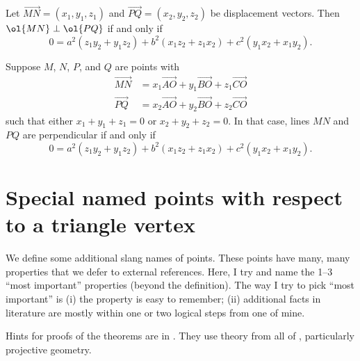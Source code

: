 \documentclass[11pt]{scrartcl}
\begin{document}
\begin{theorem}
  Let $\overrightarrow{MN} = (x_1, y_1, z_1)$
  and $\overrightarrow{PQ} = (x_2, y_2, z_2)$ be displacement vectors.
  Then $\ol{MN} \perp \ol{PQ}$ if and only if
  \[  0 = a^2(z_1y_2 + y_1z_2) + b^2(x_1z_2 + z_1x_2) + c^2(y_1x_2 + x_1y_2). \]
\end{theorem}

\begin{theorem}
  Suppose $M$, $N$, $P$, and $Q$ are points with
  \begin{align*}
    \overrightarrow{MN} &= x_1 \overrightarrow{AO} + y_1 \overrightarrow{BO} + z_1 \overrightarrow{CO} \\
    \overrightarrow{PQ} &= x_2 \overrightarrow{AO} + y_2 \overrightarrow{BO} + z_2 \overrightarrow{CO}
  \end{align*}
  such that either $x_1+y_1+z_1=0$ or $x_2+y_2+z_2=0$.
  In that case, lines $MN$ and $PQ$ are perpendicular if and only if
  \[ 0 = a^2(z_1y_2 + y_1z_2) + b^2(x_1z_2 + z_1x_2) + c^2(y_1x_2 + x_1y_2). \]
\end{theorem}

\newpage

\section{Special named points with respect to a triangle vertex}
\label{sec:named}

We define some additional slang names of points.
These points have many, many properties that we defer to external references.
Here, I try and name the 1--3 ``most important'' properties (beyond the definition).
The way I try to pick ``most important'' is (i) the property is easy to remember;
(ii) additional facts in literature are mostly within
one or two logical steps from one of mine.

Hints for proofs of the theorems are in .
They use theory from all of \cite{EGMO16}, particularly projective geometry.
\end{document}
